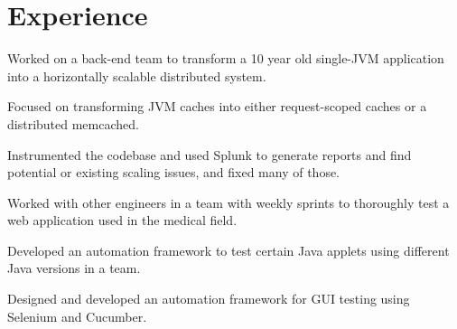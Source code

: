 \documentclass[letter]{deedy-resume} %
\begin{document}
\begin{minipage}[t]{0.66\textwidth} %


\section{Experience}



\vspace{\topsep} %
\begin{tightitemize}
\item Worked on a back-end team to transform a 10 year old single-JVM application into a horizontally scalable distributed system.
\item Focused on transforming JVM caches into either request-scoped caches or a distributed memcached.
\item Instrumented the codebase and used Splunk to generate reports and find potential or existing scaling issues, and fixed many of those.
\end{tightitemize}

\sectionspace %



\vspace{\topsep} %
\begin{tightitemize}
\item Worked with other engineers in a team with weekly sprints to thoroughly test a web application used in the medical field.
\item Developed an automation framework to test certain Java applets using different Java versions in a team.
\item Designed and developed an automation framework for GUI testing using Selenium and Cucumber.
\end{tightitemize}

\sectionspace %


\end{minipage}
\end{document}
